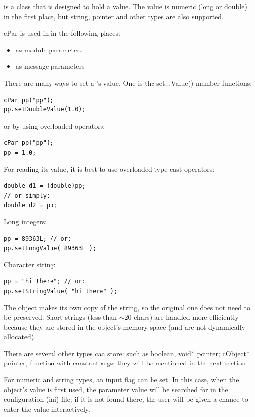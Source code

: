  is a class that is designed to hold a value. The value
is numeric (long or double) in the first place, but string, pointer
and other types are also supported.

cPar is used in {\opp} in the following places:

\begin{itemize}
  \item{as module parameters}
  \item{as message parameters}
\end{itemize}

There are many ways to set a 's value. One is the set...Value()
member functions:

\begin{verbatim}
cPar pp("pp");
pp.setDoubleValue(1.0);
\end{verbatim}


or by using overloaded operators:

\begin{verbatim}
cPar pp("pp");
pp = 1.0;
\end{verbatim}


For reading its value, it is best to use overloaded type cast
operators:

\begin{verbatim}
double d1 = (double)pp;
// or simply:
double d2 = pp;
\end{verbatim}

Long integers:

\begin{verbatim}
pp = 89363L; // or:
pp.setLongValue( 89363L );
\end{verbatim}

Character string:

\begin{verbatim}
pp = "hi there"; // or:
pp.setStringValue( "hi there" );
\end{verbatim}


The  object makes its own copy of the string, so the
original one does not need to be preserved. Short strings (less than
\ensuremath{\sim}20 chars) are handled more efficiently because they
are stored in the object's memory space (and are not dynamically
allocated).

There are several other types  can store: such as boolean,
void* pointer; cObject* pointer,  function with constant args;
they will be mentioned in the next section.

For numeric and string types, an input flag can be
set. In this case, when the object's value is first used, the
parameter value will be searched for in the configuration (ini)
file; if it is not found there, the user will be given
a chance to enter the value interactively.


